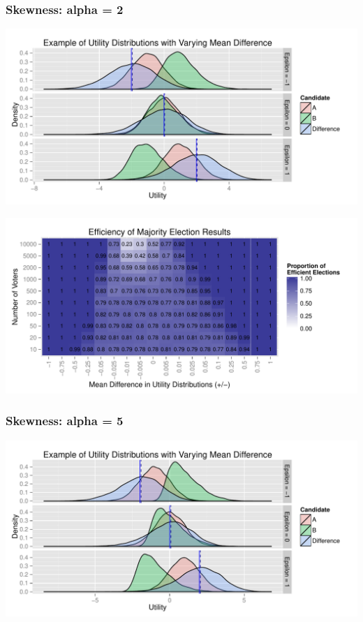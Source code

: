 \documentclass[12pt]{scrartcl}\usepackage[]{graphicx}\usepackage[]{color}
\makeatletter
\def\maxwidth{ %
  \ifdim\Gin@nat@width>\linewidth
    \linewidth
  \else
    \Gin@nat@width
  \fi
}
\newenvironment{knitrout}{}{} %
\makeatother
\begin{document}
\clearpage
\subsubsection{Skewness: alpha = 2}
\begin{knitrout}
\color{fgcolor}
\includegraphics[width=\maxwidth]{figure/unnamed-chunk-6} 

\end{knitrout}


\begin{knitrout}
\color{fgcolor}
\includegraphics[width=\maxwidth]{figure/unnamed-chunk-7} 

\end{knitrout}


\clearpage
\subsubsection{Skewness: alpha = 5}
\begin{knitrout}
\color{fgcolor}
\includegraphics[width=\maxwidth]{figure/unnamed-chunk-8} 

\end{knitrout}
\end{document}
